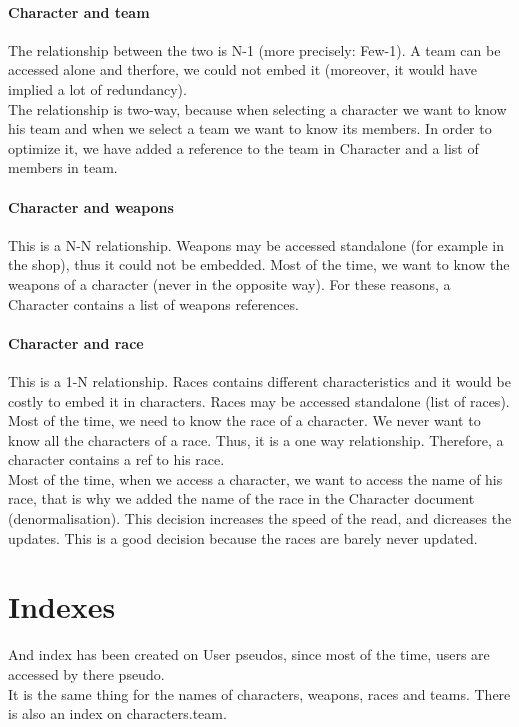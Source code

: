 \documentclass[a4paper, 11pt]{article}
\begin{document}
\paragraph{Character and team}
The relationship between the two is N-1 (more precisely: Few-1). A team can be accessed alone and therfore, we could not embed it (moreover, it would have implied a lot of redundancy).\\
The relationship is two-way, because when selecting a character we want to know his team and when we select a team we want to know its members.
In order to optimize it, we have added a reference to the team in Character and a list of members in team.

\paragraph{Character and weapons}
This is a N-N relationship. Weapons may be accessed standalone (for example in the shop), thus it could not be embedded. Most of the time, we want to know the weapons of a character (never in the opposite way). For these reasons, a Character contains a list of weapons references.

\paragraph{Character and race}
This is a 1-N relationship. Races contains different characteristics and it would be costly to embed it in characters. Races may be accessed standalone (list of races). Most of the time, we need to know the race of a character. We never want to know all the characters of a race. Thus, it is a one way relationship. Therefore, a character contains a ref to his race. \\
Most of the time, when we access a character, we want to access the name of his race, that is why we added the name of the race in the Character document (denormalisation). This decision increases the speed of the read, and dicreases the updates. This is a good decision because the races are barely never updated.

\section{Indexes}
And index has been created on User pseudos, since most of the time, users are accessed by there pseudo.\\
It is the same thing for the names of characters, weapons, races and teams.
There is also an index on characters.team.
\end{document}
